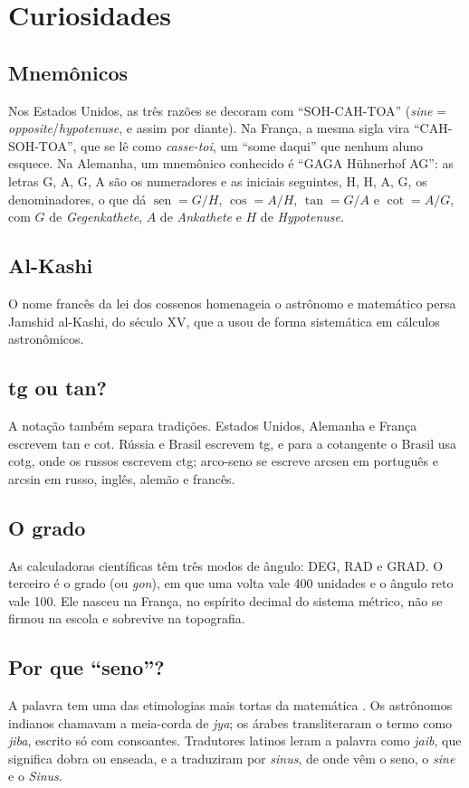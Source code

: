 \documentclass[
    article,
    12pt,
    a4paper,
    sumario=tradicional
]{abntex2}
\begin{document}
\section{Curiosidades}

\subsection{Mnemônicos}
 Nos Estados Unidos, as três razões se decoram com
``SOH-CAH-TOA'' (\textit{sine} = \textit{opposite}/\textit{hypotenuse}, e assim por
diante). Na França, a mesma sigla vira ``CAH-SOH-TOA'', que se lê como
\textit{casse-toi}, um ``some daqui'' que nenhum aluno esquece. Na Alemanha, um
mnemônico conhecido é ``GAGA Hühnerhof AG'': as letras G, A, G, A são os
numeradores e as iniciais seguintes, H, H, A, G, os denominadores, o que dá
$\operatorname{sen} = G/H$, $\cos = A/H$, $\tan = G/A$ e $\cot = A/G$, com $G$ de
\textit{Gegenkathete}, $A$ de \textit{Ankathete} e $H$ de \textit{Hypotenuse}.

\subsection{Al-Kashi}
 O nome francês da lei dos cossenos homenageia o
astrônomo e matemático persa Jamshid al-Kashi, do século XV, que a usou de
forma sistemática em cálculos astronômicos.

\subsection{tg ou tan?}
 A notação também separa tradições. Estados Unidos,
Alemanha e França escrevem tan e cot. Rússia e Brasil escrevem tg, e para a cotangente o Brasil
usa cotg, onde os russos escrevem ctg; arco-seno se escreve
arcsen em português e arcsin em russo, inglês, alemão e francês.

\subsection{O grado}
 As calculadoras científicas têm três modos de ângulo:
DEG, RAD e GRAD. O terceiro é o grado (ou \textit{gon}), em que uma volta vale
400 unidades e o ângulo reto vale 100. Ele nasceu na França, no espírito
decimal do sistema métrico, não se firmou na escola e sobrevive na topografia.

\subsection{Por que ``seno''?}
 A palavra tem uma das etimologias mais tortas da
matemática \cite{maor1998,vanbrummelen2009}. Os astrônomos indianos chamavam a
meia-corda de \textit{jya}; os árabes transliteraram o termo como \textit{jiba},
escrito só com consoantes. Tradutores latinos leram a palavra como
\textit{jaib}, que significa dobra ou enseada, e a traduziram por
\textit{sinus}, de onde vêm o seno, o \textit{sine} e o \textit{Sinus}.
\end{document}
